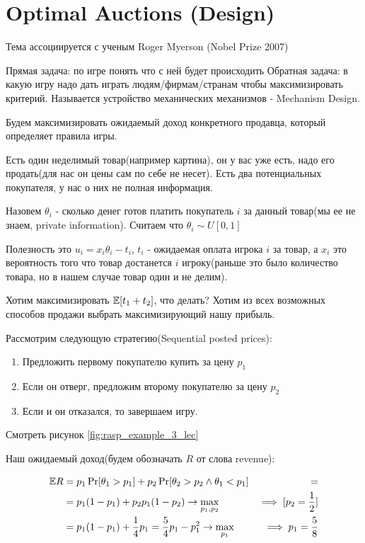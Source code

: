 
\section{Optimal Auctions (Design)}

Тема ассоциируется с ученым Roger Myerson (Nobel Prize 2007)

Прямая задача: по игре понять что с ней будет происходить
Обратная задача: в какую игру надо дать играть людям/фирмам/странам чтобы максимизировать критерий. Называется устройство механических механизмов - Mechanism Design.

Будем максимизировать ожидаемый доход конкретного продавца, который определяет правила игры.

\begin{exmpl}
	Есть один неделимый товар(например картина), он у вас уже есть, надо его продать(для нас он цены сам по себе не несет).
	Есть два потенциальных покупателя, у нас о них не полная информация.

	Назовем $\theta_i$ - сколько денег готов платить покупатель  $i$ за данный товар(мы ее не знаем, private information).
	Считаем что $\theta_i \sim U[0, 1]$

	Полезность это $u_i = x_i \theta_i - t_i$, $t_i$ - ожидаемая оплата игрока $i$ за товар, а  $x_i$ это вероятность того что товар достанется  $i$ игроку(раньше это было количество товара, но в нашем случае товар один и не делим).

	Хотим максимизировать  $\mathbb E[t_1 + t_2]$, что делать? Хотим из всех возможных способов продажи выбрать максимизирующий нашу прибыль.

	Рассмотрим следующую стратегию(Sequential posted prices):
	\begin{enumerate}
		\item Предложить первому покупателю купить за цену $p_1$
		\item Если он отверг, предложим второму покупателю за цену $p_2$
		\item Если и он отказался, то завершаем игру.
	\end{enumerate}

	Смотреть рисунок \ref{fig:rasp_example_3_lec}

	Наш ожидаемый доход(будем обозначать $R$ от слова revenue):

	\begin{align*}
		\mathbb E R &= p_1 \Pr[\theta_1 > p_1] + p_2 \Pr[\theta_2 > p_2 \land \theta_1 < p_1] &= \\
			 &= p_1 (1 - p_1) + p_2 p_1 (1 - p_2) \to \max_{p_1, p_2} &\implies [p_2 = \frac{1}{2}]\\
			 &= p_1 (1 - p_1) + \frac{1}{4} p_1 = \frac{5}{4} p_1 - p_1^2 \to \max_{p_1} &\implies p_1 = \frac{5}{8}
	\end{align*}


\end{exmpl}
